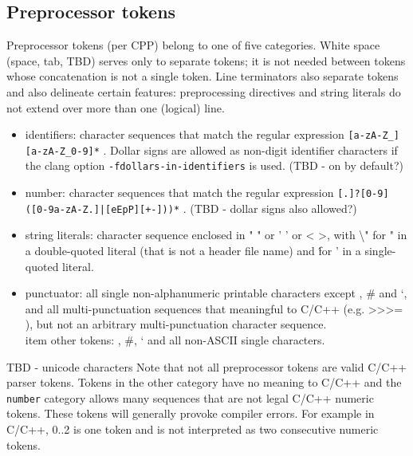\subsection{Preprocessor tokens}
Preprocessor tokens (per CPP) belong to one of five categories. White space (space, tab, TBD) serves only to separate tokens; it is not needed between tokens whose concatenation is not a single token. Line terminators also separate tokens and also delineate certain features: preprocessing directives and string literals do not extend over more than one (logical) line.
\begin{itemize}
	\item identifiers: character sequences that match the regular expression \texttt{[a-zA-Z\_][a-zA-Z\_0-9]*} . Dollar signs are allowed as non-digit identifier characters if the clang option \texttt{-fdollars-in-identifiers} is used. (TBD - on by default?)
	\item number: character sequences that match the regular expression \texttt{[.]?[0-9]([0-9a-zA-Z.]|[eEpP][+-]))*} . (TBD - dollar signs also allowed?)
	\item string literals: character sequence enclosed in " " or ' ' or < >, with \textbackslash " for " in a double-quoted literal (that is not a header file name) and \' for ' in a single-quoted literal.
	\item punctuator: all single non-alphanumeric printable characters except \@, \# and `, and all multi-punctuation sequences that meaningful to C/C++ (e.g. >>>= ), but not an arbitrary multi-punctuation character sequence.
	\\item other tokens: \@, \#, ` and all non-ASCII single characters.
\end{itemize}
TBD - unicode characters
Note that not all preprocessor tokens are valid C/C++ parser tokens. Tokens in the other category have no meaning to C/C++ and the \texttt{number} category allows many sequences that are not legal C/C++ numeric tokens. These tokens will generally provoke compiler errors. For example in C/C++, 0..2 is one token and is not interpreted as two consecutive numeric tokens.

